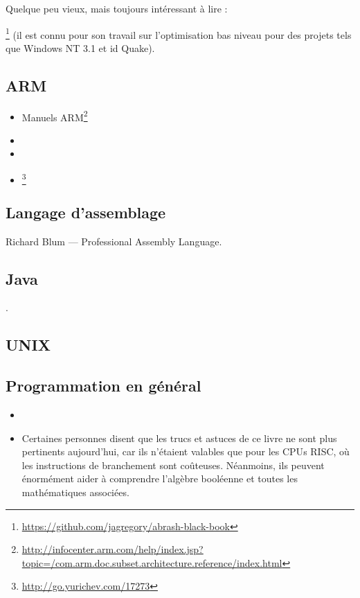 Quelque peu vieux, mais toujours intéressant à lire :

\MAbrash\footnote{\AlsoAvailableAs \url{https://github.com/jagregory/abrash-black-book}}
(il est connu pour son travail sur l'optimisation bas niveau pour des projets tels que Windows NT 3.1 et id Quake).

\subsection{ARM}

\begin{itemize}
\item Manuels ARM\footnote{\AlsoAvailableAs \url{http://infocenter.arm.com/help/index.jsp?topic=/com.arm.doc.subset.architecture.reference/index.html}}

\item \ARMSevenRef

\item \ARMSixFourRefURL

\item \ARMCookBook\footnote{\AlsoAvailableAs \url{http://go.yurichev.com/17273}}
\end{itemize}

\subsection{Langage d'assemblage}

Richard Blum --- Professional Assembly Language.

\subsection{Java}

\JavaBook.

\subsection{UNIX}

\TAOUP

\subsection{Programmation en général}

\begin{itemize}

\item \RobPikePractice

\item \HenryWarren
Certaines personnes disent que les trucs et astuces de ce livre ne sont plus pertinents
aujourd'hui, car ils n'étaient valables que pour les \ac{CPU}s \ac{RISC}, où les instructions
de branchement sont coûteuses.
Néanmoins, ils peuvent énormément aider à comprendre l'algèbre booléenne et toutes les
mathématiques associées.

\end{itemize}

